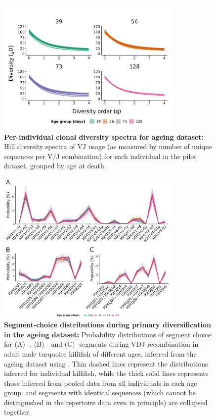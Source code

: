 \begin{figure}
\centering
\includegraphics[width = 0.8\textwidth]{_Figures/png/ageing-VJ-diversity-solo-spectra}
\caption[Per-individual clonal diversity spectra for ageing dataset]{\textbf{Per-individual clonal diversity spectra for ageing dataset:} Hill diversity spectra of VJ usage (as measured by number of unique sequences per V/J combination) for each individual in the \igseq pilot dataset, grouped by age at death.}
\label{fig:igseq-ageing-vj-diversity-solo-spectra}
\end{figure}

\begin{figure}
\centering
\includegraphics[width = 0.8\textwidth]{_Figures/png/ageing-igor-segments}
\caption[Segment-choice distributions during primary diversification in the ageing dataset]
{\textbf{Segment-choice distributions during primary diversification in the ageing dataset:} Probability distributions of segment choice for (A) \vh-, (B) \dh- and (C) \jh-segments during VDJ recombination in adult male turquoise killifish of different ages, inferred from the \igseq ageing dataset using . Thin dashed lines represent the distributions inferred for individual killifish, while the thick solid lines represents those inferred from pooled data from all individuals in each age group. \dh and \jh segments with identical sequences (which cannot be distinguished in the repertoire data even in principle) are collapsed together.}
\label{fig:igseq-ageing-igor-segments}
\end{figure}

